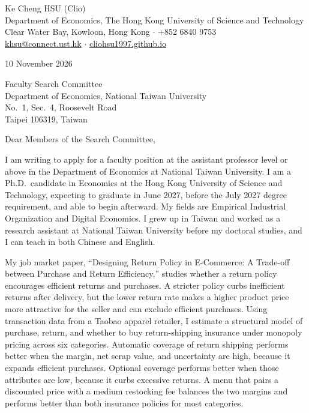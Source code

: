 \documentclass[11pt]{article}
\begin{document}
\begin{flushleft}
Ke Cheng HSU (Clio) \\
Department of Economics, The Hong Kong University of Science and Technology \\
Clear Water Bay, Kowloon, Hong Kong $\cdot$ +852 6840 9753 \\
\href{mailto:khsu@connect.ust.hk}{khsu@connect.ust.hk} $\cdot$ \href{https://cliohsu1997.github.io/}{cliohsu1997.github.io}
\end{flushleft}

10 November 2026

\vspace{0.15em}
Faculty Search Committee \\
Department of Economics, National Taiwan University \\
No.\ 1, Sec.\ 4, Roosevelt Road \\
Taipei 106319, Taiwan

\vspace{0.15em}
Dear Members of the Search Committee,

I am writing to apply for a faculty position at the assistant professor level or above in the Department of Economics at National Taiwan University. I am a Ph.D.\ candidate in Economics at the Hong Kong University of Science and Technology, expecting to graduate in June 2027, before the July 2027 degree requirement, and able to begin afterward. My fields are Empirical Industrial Organization and Digital Economics. I grew up in Taiwan and worked as a research assistant at National Taiwan University before my doctoral studies, and I can teach in both Chinese and English.

My job market paper, ``Designing Return Policy in E-Commerce: A Trade-off between Purchase and Return Efficiency,'' studies whether a return policy encourages efficient returns and purchases. A stricter policy curbs inefficient returns after delivery, but the lower return rate makes a higher product price more attractive for the seller and can exclude efficient purchases. Using transaction data from a Taobao apparel retailer, I estimate a structural model of purchase, return, and whether to buy return-shipping insurance under monopoly pricing across six categories. Automatic coverage of return shipping performs better when the margin, net scrap value, and uncertainty are high, because it expands efficient purchases. Optional coverage performs better when those attributes are low, because it curbs excessive returns. A menu that pairs a discounted price with a medium restocking fee balances the two margins and performs better than both insurance policies for most categories.
\end{document}
